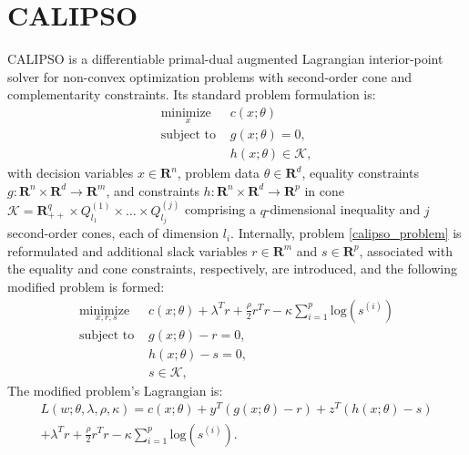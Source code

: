 \section{CALIPSO} \label{calipso}
CALIPSO is a differentiable primal-dual augmented Lagrangian interior-point solver for non-convex optimization problems with second-order cone and complementarity constraints. Its standard problem formulation is:
\begin{equation}
	\begin{array}{ll}
		\underset{x}{\mbox{minimize }}  & c(x; \theta) \\
		\mbox{subject to } & g(x; \theta) = 0, \\
		& h(x; \theta) \in \mathcal{K},
	\end{array}
	\label{calipso_problem}
\end{equation}
with decision variables $x \in \mathbf{R}^n$, problem data $\theta \in \mathbf{R}^d$, equality constraints $g : \mathbf{R}^n \times \mathbf{R}^d \rightarrow \mathbf{R}^m$, and constraints $h : \mathbf{R}^n \times \mathbf{R}^d \rightarrow \mathbf{R}^p$ in cone $\mathcal{K} = \mathbf{R}_{++}^q \times Q_{l_1}^{(1)} \times \dots \times Q_{l_j}^{(j)}$ comprising a $q$-dimensional inequality and $j$ second-order cones, each of dimension $l_i$. Internally, problem \eqref{calipso_problem} is reformulated and additional slack variables $r \in \mathbf{R}^m$ and $s \in \mathbf{R}^p$, associated with the equality and cone constraints, respectively, are introduced, and the following modified problem is formed:
\begin{equation}
	\begin{array}{ll}
		\underset{x, r, s}{\mbox{minimize }}  & c(x; \theta) + \lambda^T r + \frac{\rho}{2} r^T r - \kappa \sum \limits_{i = 1}^p \mbox{log}(s^{(i)}) \\
		\mbox{subject to } & g(x; \theta) - r  =0, \\
		& h(x; \theta) - s = 0, \\
		& s \in \mathcal{K},
	\end{array}
	\label{calipso_internal_problem}
\end{equation}
The modified problem's Lagrangian is:
\begin{multline} 
	L(w; \theta, \lambda, \rho, \kappa) = c(x; \theta) + y^T (g(x; \theta) - r) + z^T (h(x; \theta) - s) \\
	+ \lambda^T r + \frac{\rho}{2} r^T r - \kappa \sum \limits_{i = 1}^p \mbox{log}(s^{(i)}). \label{calipso_lagrangian}
\end{multline}
